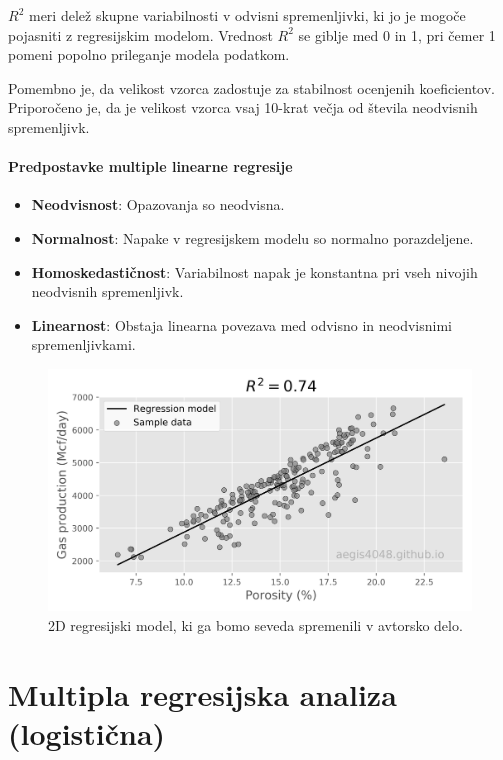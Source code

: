 $R^2$ meri delež skupne variabilnosti v odvisni spremenljivki, ki jo je mogoče pojasniti z regresijskim modelom. Vrednost $R^2$ se giblje med 0 in 1, pri čemer 1 pomeni popolno prileganje modela podatkom.

Pomembno je, da velikost vzorca zadostuje za stabilnost ocenjenih koeficientov. Priporočeno je, da je velikost vzorca vsaj 10-krat večja od števila neodvisnih spremenljivk.

\paragraph{Predpostavke multiple linearne regresije}
\begin{itemize}
    \item \textbf{Neodvisnost}: Opazovanja so neodvisna.
    \item \textbf{Normalnost}: Napake v regresijskem modelu so normalno porazdeljene.
    \item \textbf{Homoskedastičnost}: Variabilnost napak je konstantna pri vseh nivojih neodvisnih spremenljivk.
    \item \textbf{Linearnost}: Obstaja linearna povezava med odvisno in neodvisnimi spremenljivkami.
\end{itemize}

\begin{figure}[h]
    \centering
    \includegraphics[width=\textwidth]{pictures/regresija.png}
    \caption{2D regresijski model, ki ga bomo seveda spremenili v avtorsko delo.}
    \label{fig:regresija}
\end{figure}

\section{Multipla regresijska analiza (logistična)}

